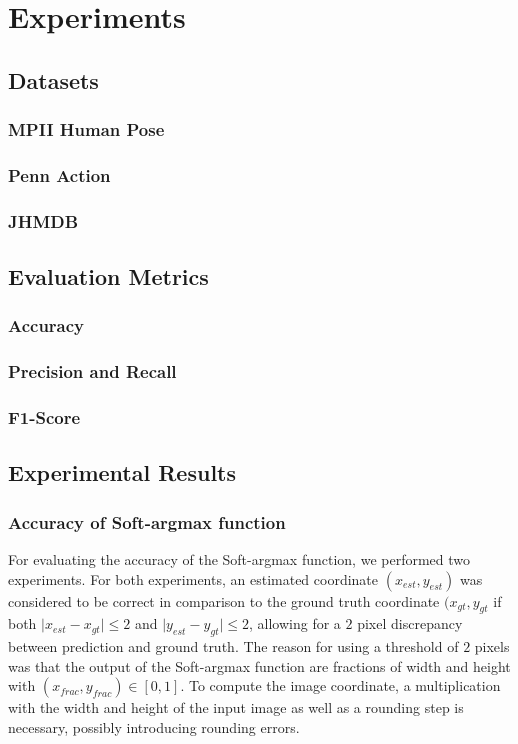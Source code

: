 \chapter{Experiments}

\section{Datasets}
\label{sec:exp-datasets}
\subsection{MPII Human Pose}
\label{sec:exp-mpii}

\subsection{Penn Action}
\label{sec:exp-penn}

\subsection{JHMDB}
\label{sec:exp-jhmdb}


\section{Evaluation Metrics}
\subsection{Accuracy}

\subsection{Precision and Recall}

\subsection{F1-Score}


\section{Experimental Results}
\subsection{Accuracy of Soft-argmax function}
For evaluating the accuracy of the Soft-argmax function, we performed two experiments.
For both experiments, an estimated coordinate $(x_{est},y_{est})$ was considered to be correct in comparison to the ground truth coordinate $(x_{gt}, y_{gt}$ if both $\lvert x_{est} - x_{gt} \rvert \leq 2$ and $\lvert y_{est} - y_{gt} \rvert \leq 2$, allowing for a $2$ pixel discrepancy between prediction and ground truth.
The reason for using a threshold of $2$ pixels was that the output of the Soft-argmax function are fractions of width and height with $(x_{frac}, y_{frac}) \in [0,1]$.
To compute the image coordinate, a multiplication with the width and height of the input image as well as a rounding step is necessary, possibly introducing rounding errors.

